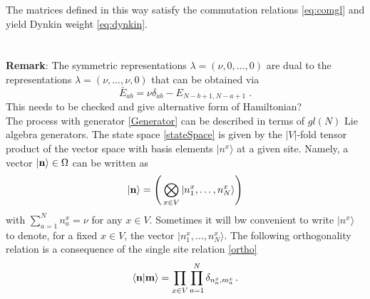 \documentclass[10pt]{article}
\numberwithin{equation}{section}
\numberwithin{equation}{subsection}
\newcommand{\dt}{\;.}
\newcommand{\twoj}{\nu}
\begin{document}
The matrices defined in this way satisfy the commutation relations \eqref{eq:comgl} and yield Dynkin weight \eqref{eq:dynkin}. \\
\\ \\
\textbf{Remark}: The symmetric representations $\lambda=(\twoj,0,\ldots,0)$ are dual to the representations $\lambda=(\twoj,\ldots,\twoj,0)$ that can be obtained via 
\begin{equation}
   \bar E_{ab}=\nu\delta_{ab}-E_{N-b+1,N-a+1}\dt
\end{equation}
{\color{red} This needs to be checked and give alternative form of Hamiltonian?}\\
The process with generator \eqref{Generator} can be described in terms of $gl(N)$ Lie algebra generators. The state space \eqref{stateSpace} is given by the $|V|$-fold tensor product of the vector space with basis elements $|n^x\rangle$ at a given site. Namely,
a vector $|{\bf n}\rangle \in \Omega$ can be written as
\begin{equation}
|{\bf n}\rangle=\left(\,\bigotimes_{x\in V}	|n_{1}^{x},\ldots,n_{N}^{x}\rangle\right)
\end{equation}
with $\sum_{a=1}^{N}n_{a}^{x}=\nu$ for any $x\in V$. Sometimes it will bw convenient to write $|n^{x}\rangle$ to denote, for a fixed $x\in V$, the vector $|n_{1}^{x},\ldots,n_{N}^{x}\rangle$.
{\color{red}
The following orthogonality relation is a consequence of the single site relation \eqref{ortho}
\begin{equation}
    \langle {\bf n}|{\bf m}\rangle =\prod_{x\in V}\prod_{a=1}^N\delta_{n^x_a,m^{x}_a}\,.
\end{equation}
}
\end{document}
